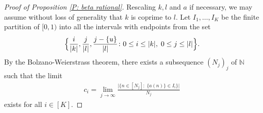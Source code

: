 \documentclass[10pt,a4paper]{amsart}
\newcommand{\floor}[1]{{\left \lfloor #1 \right \rfloor}}
\begin{document}
\begin{proof}[Proof of Proposition \ref{P: beta rational}]
Rescaling $k,l$ and $a$ if necessary, we may assume without loss of generality that $k$ is coprime to $l$. Let $I_1, \ldots, I_K$ be the finite partition of $[0,1)$ into all the intervals with endpoints from the set
    \begin{align}\label{E: endpoints}
        \Bigl\{\frac{i}{\vert k\vert},\frac{j}{\vert l\vert}, \frac{j-\{u\}}{\vert l\vert}\colon 0\leq i\leq \vert k\vert,\; 0\leq j\leq \vert l\vert\Bigr\}.
    \end{align}
By the Bolzano-Weierstrass theorem, there exists a subsequence $(N_j)_j$ of $\mathbb{N}$ such that
the limit 
\begin{align}\label{E: weights}
    c_i =\lim_{j\to\infty}\frac{\vert\{n\in[N_j]\colon\; \{a(n)\}\in I_i\}\vert}{N_{j}}
\end{align}
    exists for all $i\in[K]$.




\end{proof}
\end{document}
